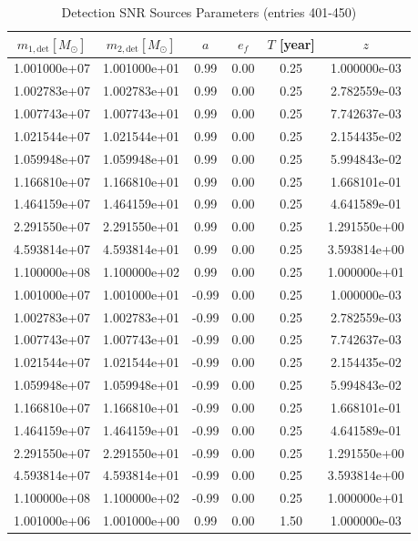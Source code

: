\documentclass{article}
\begin{document}
\clearpage

\begin{table}[htbp]
\centering
\caption{Detection SNR Sources Parameters (entries 401-450)}
\label{tab:snr_sources_9}
\begin{tabular}{cccccc}
\hline
$m_{1,\mathrm{det}} [M_\odot]$ & $m_{2,\mathrm{det}} [M_\odot]$ & $a$ & $e_f$ & $T$ [year] & $z$ \\
\hline
1.001000e+07 & 1.001000e+01 & 0.99 & 0.00 & 0.25 & 1.000000e-03 \\
1.002783e+07 & 1.002783e+01 & 0.99 & 0.00 & 0.25 & 2.782559e-03 \\
1.007743e+07 & 1.007743e+01 & 0.99 & 0.00 & 0.25 & 7.742637e-03 \\
1.021544e+07 & 1.021544e+01 & 0.99 & 0.00 & 0.25 & 2.154435e-02 \\
1.059948e+07 & 1.059948e+01 & 0.99 & 0.00 & 0.25 & 5.994843e-02 \\
1.166810e+07 & 1.166810e+01 & 0.99 & 0.00 & 0.25 & 1.668101e-01 \\
1.464159e+07 & 1.464159e+01 & 0.99 & 0.00 & 0.25 & 4.641589e-01 \\
2.291550e+07 & 2.291550e+01 & 0.99 & 0.00 & 0.25 & 1.291550e+00 \\
4.593814e+07 & 4.593814e+01 & 0.99 & 0.00 & 0.25 & 3.593814e+00 \\
1.100000e+08 & 1.100000e+02 & 0.99 & 0.00 & 0.25 & 1.000000e+01 \\
1.001000e+07 & 1.001000e+01 & -0.99 & 0.00 & 0.25 & 1.000000e-03 \\
1.002783e+07 & 1.002783e+01 & -0.99 & 0.00 & 0.25 & 2.782559e-03 \\
1.007743e+07 & 1.007743e+01 & -0.99 & 0.00 & 0.25 & 7.742637e-03 \\
1.021544e+07 & 1.021544e+01 & -0.99 & 0.00 & 0.25 & 2.154435e-02 \\
1.059948e+07 & 1.059948e+01 & -0.99 & 0.00 & 0.25 & 5.994843e-02 \\
1.166810e+07 & 1.166810e+01 & -0.99 & 0.00 & 0.25 & 1.668101e-01 \\
1.464159e+07 & 1.464159e+01 & -0.99 & 0.00 & 0.25 & 4.641589e-01 \\
2.291550e+07 & 2.291550e+01 & -0.99 & 0.00 & 0.25 & 1.291550e+00 \\
4.593814e+07 & 4.593814e+01 & -0.99 & 0.00 & 0.25 & 3.593814e+00 \\
1.100000e+08 & 1.100000e+02 & -0.99 & 0.00 & 0.25 & 1.000000e+01 \\
1.001000e+06 & 1.001000e+00 & 0.99 & 0.00 & 1.50 & 1.000000e-03 \\

\end{tabular}
\end{table}
\end{document}
